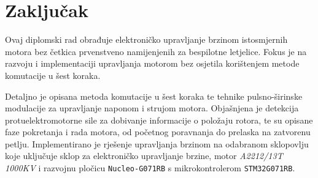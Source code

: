 \documentclass[diplomskirad]{fer}
\begin{document}
%
%
%
%
\chapter{Zaključak}
\label{pog:zakljucak}





\begin{sazetak}

	Ovaj diplomski rad obrađuje elektroničko upravljanje brzinom istosmjernih
	motora bez četkica prvenstveno namijenjenih za bespilotne letjelice. Fokus je
	na razvoju i implementaciji upravljanja motorom bez osjetila korištenjem metode
	komutacije u šest koraka.

	Detaljno je opisana metoda komutacije u šest koraka te tehnike pulsno-širinske
	modulacije za upravljanje naponom i strujom motora. Objašnjena je detekcija
	protuelektromotorne sile za dobivanje informacije o položaju rotora, te su
	opisane faze pokretanja i rada motora, od početnog poravnanja do prelaska na
	zatvorenu petlju. Implementirano je rješenje upravljanja brzinom na odabranom
	sklopovlju koje uključuje sklop za elektroničko upravljanje brzine, motor
	\textit{A2212/13T 1000KV} i razvojnu pločicu \texttt{Nucleo-G071RB} s
	mikrokontrolerom \texttt{STM32G071RB}.
\end{sazetak}
\end{document}
